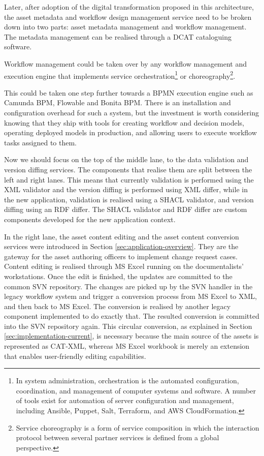 	Later, after adoption of the digital transformation proposed in this architecture, the asset metadata and workflow design management service need to be broken down into two parts: asset metadata management and workflow management. The metadata management can be realised through a DCAT \citep{dcat2} cataloguing software. 
	
	Workflow management could be taken over by any workflow management and execution engine that implements service orchestration\footnote{In system administration, orchestration is the automated configuration, coordination, and management of computer systems and software. A number of tools exist for automation of server configuration and management, including Ansible, Puppet, Salt, Terraform, and AWS CloudFormation.} or choreography\footnote{Service choreography is a form of service composition in which the interaction protocol between several partner services is defined from a global perspective.}. 
	
	This could be taken one step further towards a BPMN \citep{bpmn-introduction} execution engine such as Camunda BPM, Flowable and Bonita BPM. There is an installation and configuration overhead for such a system, but the investment is worth considering knowing that they ship with tools for creating workflow and decision models, operating deployed models in production, and allowing users to execute workflow tasks assigned to them. 
	
	Now we should focus on the top of the middle lane, to the data validation and version diffing services. The components that realise them are split between the left and right lanes. This means that currently validation is performed using the XML validator and the version diffing is performed using XML differ, while in the new application, validation is realised using a SHACL \citep{shacl-spec} validator, and version diffing using an RDF differ. The SHACL validator and RDF differ are custom components developed for the new application context.
	
	In the right lane, the asset content editing and the asset content conversion services were introduced in Section \ref{sec:application-overview}. They are the gateway for the asset authoring officers to implement change request cases. Content editing is realised through MS Excel running on the documentalists' workstations. Once the edit is finished, the updates are committed to the common SVN repository. The changes are picked up by the SVN handler in the legacy workflow system and trigger a conversion process from MS Excel to XML, and then back to MS Excel. The conversion is realised by another legacy component implemented to do exactly that. The resulted conversion is committed into the SVN repository again. This circular conversion, as explained in Section \ref{sec:implementation-current}, is necessary because the main source of the assets is represented as CAT-XML, whereas MS Excel workbook is merely an extension that enables user-friendly editing capabilities.
	
